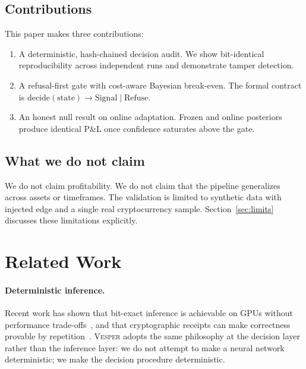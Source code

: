 \documentclass[11pt,a4paper]{article}
\newcommand{\gld}[1]{\textcolor{goldshiny}{#1}}
\newcommand{\cel}[1]{\textcolor{celadon}{#1}}
\theoremstyle{definition}
\begin{document}
\subsection{Contributions}

This paper makes three contributions:

\begin{enumerate}[label=\gld{\arabic*.}, leftmargin=2em]
  \item A \gld{deterministic, hash-chained decision audit}. We show bit-identical reproducibility across independent runs and demonstrate tamper detection.
  \item A \gld{refusal-first gate with cost-aware Bayesian break-even}. The formal contract is $\mathrm{decide}(\mathrm{state}) \to \mathrm{Signal} \mid \mathrm{Refuse}$.
  \item An \cel{honest null result} on online adaptation. Frozen and online posteriors produce identical P\&L once confidence saturates above the gate.
\end{enumerate}

\subsection{What we do not claim}

We do not claim profitability. We do not claim that the pipeline generalizes across assets or timeframes. The validation is limited to synthetic data with injected edge and a single real cryptocurrency sample. Section~\ref{sec:limits} discusses these limitations explicitly.

\section{Related Work}

\paragraph{Deterministic inference.}
Recent work has shown that bit-exact inference is achievable on GPUs without performance trade-offs~\cite{bit-exact-2026}, and that cryptographic receipts can make correctness provable by repetition~\cite{eigenai-2025}. \textsc{Vesper} adopts the same philosophy at the \cel{decision} layer rather than the inference layer: we do not attempt to make a neural network deterministic; we make the decision procedure deterministic.
\end{document}
